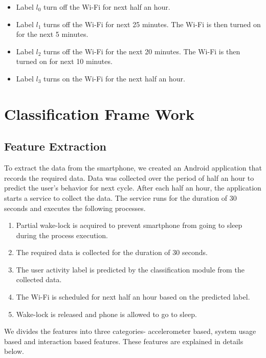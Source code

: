 \begin{itemize}
\item Label $l_0$ turn off the Wi-Fi for next half an hour.
\item Label $l_1$ turns off the Wi-Fi for next 25 minutes. The Wi-Fi is then turned on for the next 5 minutes.
\item Label $l_2$ turns off the Wi-Fi for the next 20 minutes. The Wi-Fi is then turned on for next 10 minutes.
\item Label $l_3$ turns on the Wi-Fi for the next half an hour.
\end{itemize}
\begin{center}
\begin{figure}[!ht]
\end{figure}
\end{center}

\section{Classification Frame Work}

\subsection{Feature Extraction}
\label{sec:Features}

To extract the data from the smartphone, we created an
Android application that records the required data.
Data was collected over the period of half an hour to
predict the user’s behavior for next cycle. After each
half an hour, the application starts a service to collect the data.
The service runs for the duration of 30 seconds and executes
the following processes.


\begin{enumerate}
\item Partial wake-lock is acquired to prevent smartphone from going to sleep during the process execution.
\item The required data is collected for the duration of 30 seconds.
\item The user activity label is predicted by the classification module from the collected data.
\item The Wi-Fi is scheduled for next half an hour based on the predicted label.
\item Wake-lock is released and phone is allowed to go to sleep.
\end{enumerate}
We divides the features into three categories- accelerometer based, system usage based and interaction based features. These features are explained in details below.
 
